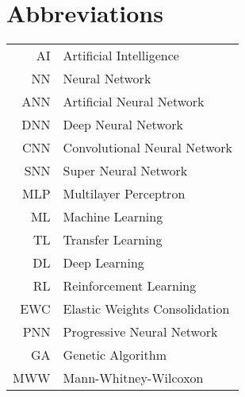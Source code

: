 \chapter*{Abbreviations}
\begin{table}[h]
    \centering
    \begin{tabular}{r|l}
    
AI     & Artificial Intelligence\\
NN     & Neural Network\\
ANN    & Artificial Neural Network\\
DNN    & Deep Neural Network\\
CNN    & Convolutional Neural Network\\
SNN    & Super Neural Network\\
MLP    & Multilayer Perceptron\\
ML     & Machine Learning\\
TL     & Transfer Learning\\
DL     & Deep Learning\\
RL     & Reinforcement Learning\\
EWC    & Elastic Weights Consolidation\\
PNN    & Progressive Neural Network\\
GA     & Genetic Algorithm\\
MWW    & Mann-Whitney-Wilcoxon

    \end{tabular}
\end{table}


